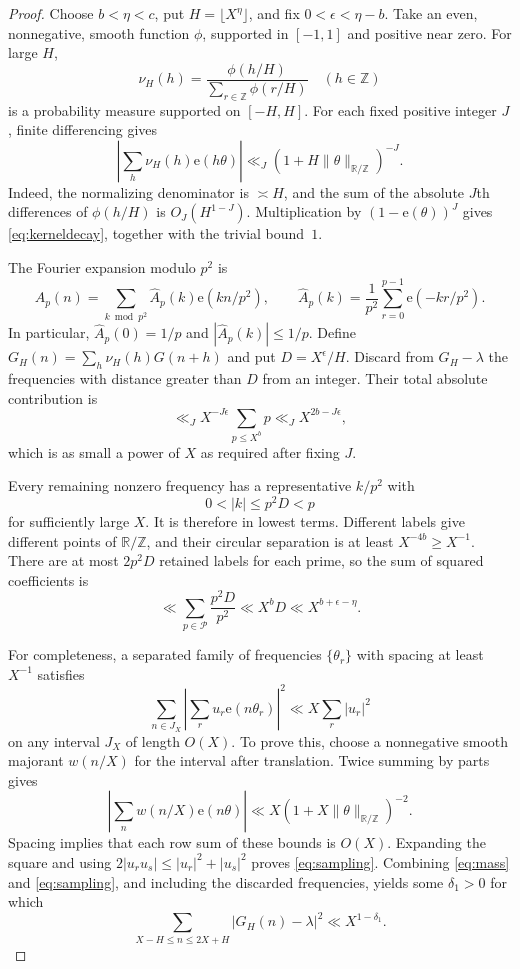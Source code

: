 \documentclass[11pt,reqno]{amsart}
\theoremstyle{remark}
\numberwithin{equation}{section}
\newcommand{\Z}{\mathbb Z}
\newcommand{\R}{\mathbb R}
\newcommand{\ee}[1]{\mathrm e\!\left(#1\right)}
\begin{document}
\begin{proof}
Choose $b<\eta<c$, put $H=\lfloor X^\eta\rfloor$, and fix
$0<\epsilon<\eta-b$. Take an even, nonnegative, smooth function
$\phi$, supported in $[-1,1]$ and positive near zero. For large $H$,
\[
 \nu_H(h)=\frac{\phi(h/H)}{\sum_{r\in\Z}\phi(r/H)}
 \quad(h\in\Z)
\]
is a probability measure supported on $[-H,H]$.
For each fixed positive integer $J$, finite differencing gives
\begin{equation}\label{eq:kerneldecay}
 \left|\sum_h\nu_H(h)\ee{h\theta}\right|
 \ll_J(1+H\|\theta\|_{\R/\Z})^{-J}.
\end{equation}
Indeed, the normalizing denominator is $\asymp H$, and the sum of
the absolute $J$th differences of $\phi(h/H)$ is $O_J(H^{1-J})$.
Multiplication by $(1-\mathrm e(\theta))^J$ gives
\eqref{eq:kerneldecay}, together with the trivial bound~$1$.

The Fourier expansion modulo $p^2$ is
\[
 A_p(n)=\sum_{k\bmod p^2}\widehat A_p(k)\ee{kn/p^2},
 \qquad
 \widehat A_p(k)=\frac1{p^2}\sum_{r=0}^{p-1}\ee{-kr/p^2}.
\]
In particular, $\widehat A_p(0)=1/p$ and
$|\widehat A_p(k)|\leq1/p$.
Define $G_H(n)=\sum_h\nu_H(h)G(n+h)$ and put
$D=X^\epsilon/H$. Discard from $G_H-\lambda$ the frequencies
with distance greater than $D$ from an integer. Their total absolute
contribution is
\[
 \ll_J X^{-J\epsilon}\sum_{p\leq X^b}p
 \ll_J X^{2b-J\epsilon},
\]
which is as small a power of $X$ as required after fixing $J$.

Every remaining nonzero frequency has a representative $k/p^2$ with
\[
 0<|k|\leq p^2D<p
\]
for sufficiently large $X$. It is therefore in lowest terms.
Different labels give different points of $\R/\Z$, and their
circular separation is at least $X^{-4b}\geq X^{-1}$.
There are at most $2p^2D$ retained labels for each prime, so the sum
of squared coefficients is
\begin{equation}\label{eq:mass}
 \ll\sum_{p\in\mathcal P}\frac{p^2D}{p^2}
 \ll X^bD\ll X^{b+\epsilon-\eta}.
\end{equation}

For completeness, a separated family of frequencies
$\{\theta_r\}$ with spacing at least $X^{-1}$ satisfies
\begin{equation}\label{eq:sampling}
 \sum_{n\in J_X}\left|\sum_r u_r\ee{n\theta_r}\right|^2
 \ll X\sum_r|u_r|^2
\end{equation}
on any interval $J_X$ of length $O(X)$.
To prove this, choose a nonnegative smooth majorant $w(n/X)$
for the interval after translation. Twice summing by parts gives
\[
 \left|\sum_nw(n/X)\ee{n\theta}\right|
 \ll X(1+X\|\theta\|_{\R/\Z})^{-2}.
\]
Spacing implies that each row sum of these bounds is $O(X)$.
Expanding the square and using
$2|u_ru_s|\leq|u_r|^2+|u_s|^2$ proves \eqref{eq:sampling}.
Combining \eqref{eq:mass} and \eqref{eq:sampling}, and including
the discarded frequencies, yields some $\delta_1>0$ for which
\begin{equation}\label{eq:smoothnorm}
 \sum_{X-H\leq n\leq2X+H}|G_H(n)-\lambda|^2
 \ll X^{1-\delta_1}.
\end{equation}


\end{proof}
\end{document}
